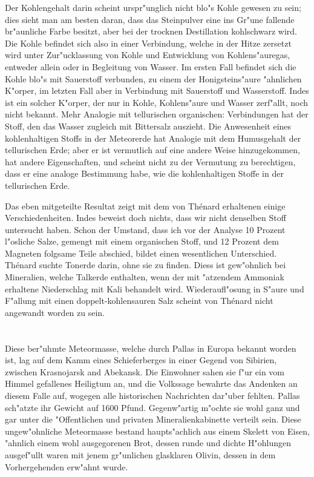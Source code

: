\documentclass[a4paper, 11pt, oneside]{article}
\begin{document}
Der Kohlengehalt darin scheint urspr"unglich nicht blo"s Kohle gewesen zu sein; dies sieht man am besten daran, dass das Steinpulver eine ins Gr"une fallende br"aunliche Farbe besitzt, aber bei der trocknen Destillation kohlschwarz wird. Die Kohle befindet sich also in einer Verbindung, welche in der Hitze zersetzt wird unter Zur"ucklassung von Kohle und Entwicklung von Kohlens"auregas, entweder allein oder in Begleitung von Wasser. Im ersten Fall befindet sich die Kohle blo"s mit Sauerstoff verbunden, zu einem der Honigsteins"aure "ahnlichen K"orper, im letzten Fall aber in Verbindung mit Sauerstoff und Wasserstoff. Indes ist ein solcher K"orper, der nur in Kohle, Kohlens"aure und Wasser zerf"allt, noch nicht bekannt. Mehr Analogie mit tellurischen organischen: Verbindungen hat der Stoff, den das Wasser zugleich mit Bittersalz auszieht. Die Anwesenheit eines kohlenhaltigen Stoffs in der Meteorerde hat Analogie mit dem Humusgehalt der tellurischen Erde; aber er ist vermutlich auf eine andere Weise hinzugekommen, hat andere Eigenschaften, und scheint nicht zu der Vermutung zu berechtigen, dass er eine analoge Bestimmung habe, wie die kohlenhaltigen Stoffe in der tellurischen Erde.

Das eben mitgeteilte Resultat zeigt mit dem von Thénard erhaltenen einige Verschiedenheiten. Indes beweist doch nichts, dass wir nicht denselben Stoff untersucht haben. Schon der Umstand, dass ich vor der Analyse 10 Prozent l"osliche Salze, gemengt mit einem organischen Stoff, und 12 Prozent dem Magneten folgsame Teile abschied, bildet einen wesentlichen Unterschied. Thénard suchte Tonerde darin, ohne sie zu finden. Diess ist gew"ohnlich bei Mineralien, welche Talkerde enthalten, wenn der mit "atzendem Ammoniak erhaltene Niederschlag mit Kali behandelt wird. Wiederaufl"osung in S"aure und F"allung mit einen doppelt-kohlensauren Salz scheint von Thénard nicht angewandt worden zu sein.

\section{}
\paragraph{}
Diese ber"uhmte Meteormasse, welche durch Pallas in Europa bekannt worden ist, lag auf dem Kamm eines Schieferberges in einer Gegend von Sibirien, zwischen Krasnojarsk and Abekansk. Die Einwohner sahen sie f"ur ein vom Himmel gefallenes Heiligtum an, und die Volkssage bewahrte das Andenken an diesem Falle auf, wogegen alle historischen Nachrichten dar"uber fehlten. Pallas sch"atzte ihr Gewicht auf 1600 Pfund. Gegenw"artig m"ochte sie wohl ganz und gar unter die "Offentlichen und privaten Mineralienkabinette verteilt sein. Diese ungew"ohnliche Meteormasse bestand haupts"achlich aus einem Skelett von Eisen, "ahnlich einem wohl ausgegorenen Brot, dessen runde und dichte H"ohlungen ausgef"ullt waren mit jenem gr"unlichen glasklaren Olivin, dessen in dem Vorhergehenden erw"ahnt wurde.
\end{document}
